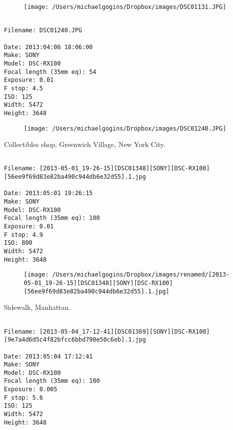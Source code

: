 \documentclass[11pt,letter,DIV=14,paper=landscape]{scrbook}
\begin{document}
\begin{figure}
\texttt{[image: /Users/michaelgogins/Dropbox/images/DSC01131.JPG]}
\end{figure}
    
\clearpage
\noindent 
\noindent
\begin{lstlisting}

Filename: DSC01240.JPG

Date: 2013:04:06 18:06:00
Make: SONY
Model: DSC-RX100
Focal length (35mm eq): 54
Exposure: 0.01
F stop: 4.5
ISO: 125
Width: 5472
Height: 3648
\end{lstlisting}
\clearpage

\begin{figure}
\texttt{[image: /Users/michaelgogins/Dropbox/images/DSC01240.JPG]}
\end{figure}
    
\clearpage
\noindent Collectibles shop, Greenwich Village, New York City.
\noindent
\begin{lstlisting}

Filename: [2013-05-01_19-26-15][DSC01348][SONY][DSC-RX100][56ee9f69d83e82ba490c944db6e32d55].1.jpg

Date: 2013:05:01 19:26:15
Make: SONY
Model: DSC-RX100
Focal length (35mm eq): 100
Exposure: 0.01
F stop: 4.9
ISO: 800
Width: 5472
Height: 3648
\end{lstlisting}
\clearpage

\begin{figure}
\texttt{[image: /Users/michaelgogins/Dropbox/images/renamed/[2013-05-01\_19-26-15][DSC01348][SONY][DSC-RX100][56ee9f69d83e82ba490c944db6e32d55].1.jpg]}
\end{figure}
    
\clearpage
\noindent Sidewalk, Manhattan.
\noindent
\begin{lstlisting}

Filename: [2013-05-04_17-12-41][DSC01369][SONY][DSC-RX100][9e7a4d6d5c4f82bfcc6bbd790e50c6eb].1.jpg

Date: 2013:05:04 17:12:41
Make: SONY
Model: DSC-RX100
Focal length (35mm eq): 100
Exposure: 0.005
F stop: 5.6
ISO: 125
Width: 5472
Height: 3648
\end{lstlisting}
\clearpage
\end{document}
